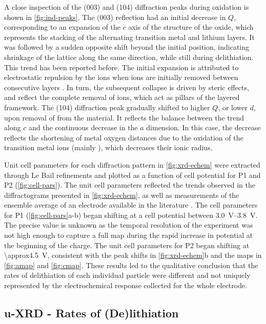 \documentclass{article}
\begin{document}
A close inspection of the (003) and (104) diffraction peaks during
oxidation is shown in \ref{fig:ind-peaks}. The (003) reflection had an
initial decrease in $Q$, corresponding to an expansion of the $c$ axis
of the structure of the oxide, which represents the stacking of the
alternating transition metal and lithium layers. It was followed by a
sudden opposite shift beyond the initial position, indicating
shrinkage of the lattice along the same direction, while still during
delithiation. This trend has been reported before. The initial
expansion is attributed to electrostatic repulsion by the 
ions when  ions are initially removed between consecutive
layers \cite{Robert2015}. In turn, the subsequent collapse is driven
by steric effects, and reflect the complete removal of  ions,
which act as pillars of the layered framework. The (104) diffraction
peak gradually shifted to higher $Q$, or lower $d$, upon removal of
 from the material. It reflects the balance between the trend
along $c$ and the continuous decrease in the $a$ dimension. In this
case, the decrease reflects the shortening of metal oxygen distances
due to the oxidation of the transition metal ions (mainly ),
which decreases their ionic radius.

Unit cell parameters for each diffraction pattern in
\ref{fig:xrd-echem} were extracted through Le Bail refinements and
plotted as a function of cell potential for P1 and P2
(\ref{fig:cell-pars}). The unit cell parameters reflected the trends
observed in the diffractograms presented in \ref{fig:xrd-echem}, as
well as measurements of the ensemble average of an electrode available
in the literature \cite{Robert2015a}. The cell parameters for P1
(\ref{fig:cell-pars}a-b) began shifting at a cell potential between
\SIrange{3.0}{3.8}{\volt}. The precise value is unknown as the
temporal resolution of the experiment was not high enough to capture a
full map during the rapid increase in potential at the beginning of
the charge. The unit cell parameters for P2 began shifting at
\SI{\approx4.5}{\volt}, consistent with the peak shifts in
\ref{fig:xrd-echem}b and the maps in \ref{fig:amap} and
\ref{fig:cmap}. These results led to the qualitative conclusion that
the rates of delithiation of each individual particle were different
and not uniquely represented by the electrochemical response collected
for the whole electrode.

\subsection{u-XRD - Rates of (De)lithiation}
\end{document}
